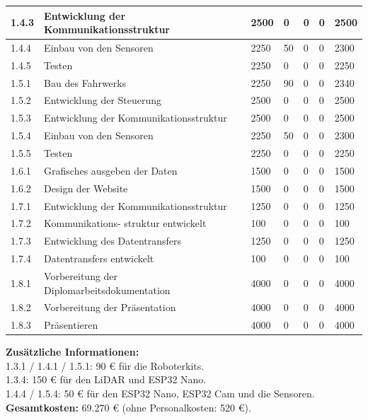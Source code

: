 \begin{longtable}[c]{|p{}|p{3cm}|p{}|p{}|p{2cm}|p{}|p{}|}
\hline
1.4.3 & Entwicklung der Kommunikationsstruktur & 2500 & 0 & 0 & 0 & 2500 \\
\hline
1.4.4 & Einbau von den Sensoren & 2250 & 50 & 0 & 0 & 2300 \\
\hline
1.4.5 & Testen & 2250 & 0 & 0 & 0 & 2250 \\
\hline
1.5.1 & Bau des Fahrwerks & 2250 & 90 & 0 & 0 & 2340 \\
\hline
1.5.2 & Entwicklung der Steuerung & 2500 & 0 & 0 & 0 & 2500 \\
\hline
1.5.3 & Entwicklung der Kommunikationsstruktur & 2500 & 0 & 0 & 0 & 2500 \\
\hline
1.5.4 & Einbau von den Sensoren & 2250 & 50 & 0 & 0 & 2300 \\
\hline
1.5.5 & Testen & 2250 & 0 & 0 & 0 & 2250 \\
\hline
1.6.1 & Grafisches ausgeben der Daten & 1500 & 0 & 0 & 0 & 1500 \\
\hline
1.6.2 & Design der Website & 1500 & 0 & 0 & 0 & 1500 \\
\hline
1.7.1 & Entwicklung der Kommunikationsstruktur & 1250 & 0 & 0 & 0 & 1250 \\
\hline
1.7.2 & Kommunikations-  struktur entwickelt & 100 & 0 & 0 & 0 & 100 \\
\hline
1.7.3 & Entwicklung des Datentransfers & 1250 & 0 & 0 & 0 & 1250 \\
\hline
1.7.4 & Datentransfers entwickelt & 100 & 0 & 0 & 0 & 100 \\
\hline
1.8.1 & Vorbereitung der Diplomarbeitsdokumentation & 4000 & 0 & 0 & 0 & 4000 \\
\hline
1.8.2 & Vorbereitung der Präsentation & 4000 & 0 & 0 & 0 & 4000 \\
\hline
1.8.3 & Präsentieren & 4000 & 0 & 0 & 0 & 4000 \\
\hline
\end{longtable}

\textbf{Zusätzliche Informationen:} \\
1.3.1 / 1.4.1 / 1.5.1: 90 € für die Roboterkits. \\
1.3.4: 150 € für den LiDAR und ESP32 Nano. \\
1.4.4 / 1.5.4: 50 € für den ESP32 Nano, ESP32 Cam und die Sensoren. \\

\textbf{Gesamtkosten:} 69.270 € (ohne Personalkosten: 520 €).

% 
